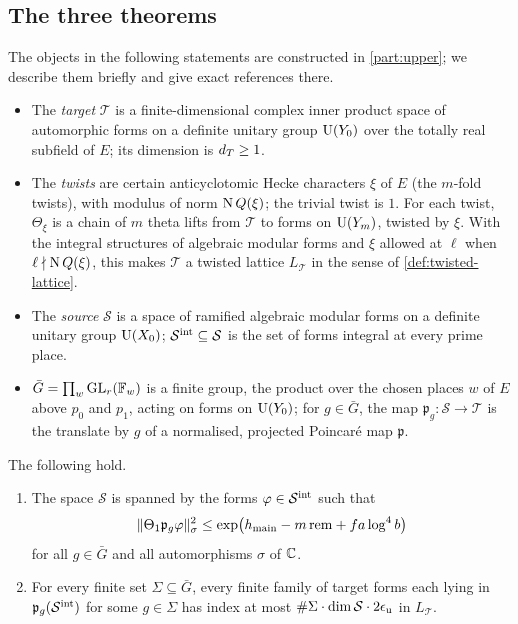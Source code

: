 \subsection{The three theorems}\label{ss:three-theorems}
The objects in the following statements are constructed in \cref{part:upper}; we describe them
briefly and give exact references there.

\begin{itemize}[leftmargin=1.5em]
\item The \emph{target} $\mathcal T$ is a finite-dimensional complex inner product space of
automorphic forms on a definite unitary group $\operatorname{U}(Y_0)$ over the totally real subfield of $E$; its
dimension is $d_T\ge1$.
\item The \emph{twists} are certain anticyclotomic Hecke characters $\xi$ of $E$ (the $m$-fold
twists), with modulus of norm $\operatorname{N} Q(\xi)$; the trivial twist is $1$. For each twist, $\Theta_\xi$ is
a chain of $m$ theta lifts from $\mathcal T$ to forms on $\operatorname{U}(Y_m)$, twisted by $\xi$. With the
integral structures of algebraic modular forms and $\xi$ allowed at $\ell$ when $\ell\nmid\operatorname{N}
Q(\xi)$, this makes $\mathcal T$ a twisted lattice $L_{\mathcal T}$ in the sense of
\cref{def:twisted-lattice}.
\item The \emph{source} $\mathcal S$ is a space of ramified algebraic modular forms on a definite
unitary group $\operatorname{U}(X_0)$; $\mathcal S^{\rm int}\subseteq\mathcal S$ is the set of forms integral at
every prime place.
\item $\bar G=\prod_w\operatorname{GL}_r(\mathbb{F}_w)$ is a finite group, the product over the chosen places $w$ of $E$
above $p_0$ and $p_1$, acting on forms on $\operatorname{U}(Y_0)$; for $g\in\bar G$, the map $\mathfrak p_g\colon
\mathcal S\to\mathcal T$ is the translate by $g$ of a normalised, projected Poincar\'e map
$\mathfrak p$.
\end{itemize}

\begin{mainthm}\label{thm:A}
The following hold.
\begin{enumerate}[label=\textup{(\alph*)}]
\item The space $\mathcal S$ is spanned by the forms $\varphi\in\mathcal S^{\rm int}$ such that
\[
  \lVert \Theta_1\mathfrak p_g\varphi\rVert_\sigma^2\le\exp\bigl(h_{\mathrm{main}}-m\,\mathrm{rem}+fa\log^4b\bigr)
\]
for all $g\in\bar G$ and all automorphisms $\sigma$ of $\mathbb{C}$.
\item For every finite set $\Sigma\subseteq\bar G$, every finite family of target forms each lying in
$\mathfrak p_g(\mathcal S^{\rm int})$ for some $g\in \Sigma$ has index at most
$\#\Sigma\cdot\dim\mathcal S\cdot2\epsilon_{\mathrm{u}}$ in $L_{\mathcal T}$.
\end{enumerate}
\end{mainthm}

